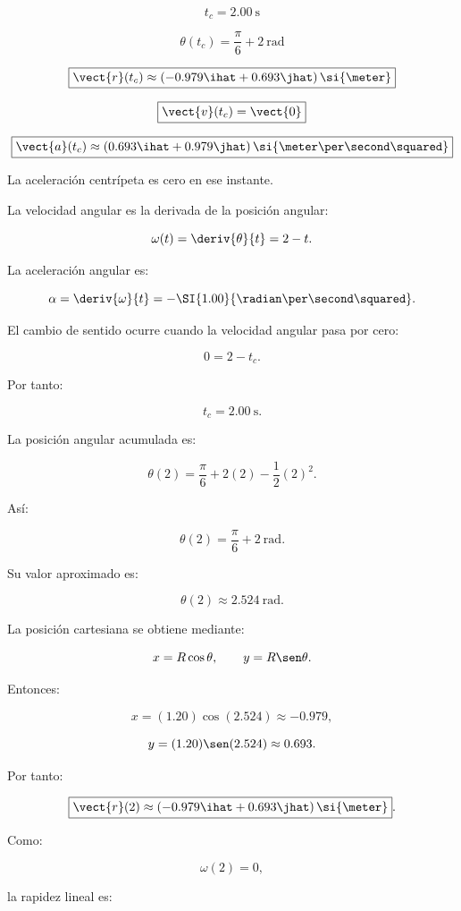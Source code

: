 \begin{respuesta}
\[
\boxed{t_c=\SI{2.00}{\second}}
\]

\[
\boxed{\theta(t_c)=\frac{\pi}{6}+2\ \si{\radian}}
\]

\[
\boxed{
\vect{r}(t_c)
\approx(-0.979\ihat+0.693\jhat)\,\si{\meter}
}
\]

\[
\boxed{\vect{v}(t_c)=\vect{0}}
\]

\[
\boxed{
\vect{a}(t_c)
\approx(0.693\ihat+0.979\jhat)\,
\si{\meter\per\second\squared}
}
\]

La aceleración centrípeta es cero en ese instante.
\end{respuesta}

\begin{explicacion}
La velocidad angular es la derivada de la posición angular:

\[
\omega(t)=\deriv{\theta}{t}=2-t.
\]

La aceleración angular es:

\[
\alpha=\deriv{\omega}{t}
=-\SI{1.00}{\radian\per\second\squared}.
\]

El cambio de sentido ocurre cuando la velocidad angular
pasa por cero:

\[
0=2-t_c.
\]

Por tanto:

\[
\boxed{t_c=\SI{2.00}{\second}}.
\]

La posición angular acumulada es:

\[
\theta(2)
=\frac{\pi}{6}+2(2)-\frac12(2)^2.
\]

Así:

\[
\boxed{\theta(2)=\frac{\pi}{6}+2\ \si{\radian}}.
\]

Su valor aproximado es:

\[
\theta(2)\approx\SI{2.524}{\radian}.
\]

La posición cartesiana se obtiene mediante:

\[
x=R\cos\theta,
\qquad
y=R\sen\theta.
\]

Entonces:

\[
x=(1.20)\cos(2.524)\approx-0.979,
\]

\[
y=(1.20)\sen(2.524)\approx0.693.
\]

Por tanto:

\[
\boxed{
\vect{r}(2)
\approx(-0.979\ihat+0.693\jhat)\,\si{\meter}
}.
\]

Como:

\[
\omega(2)=0,
\]

la rapidez lineal es:


\end{explicacion}
